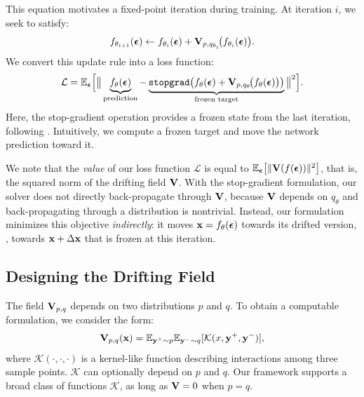 This equation motivates a fixed-point iteration during training. At iteration $i$, we seek to satisfy:
\begin{equation}
f_{\theta_{i+1}}({\boldsymbol{\epsilon}})
\leftarrow
f_{\theta_{i}}({\boldsymbol{\epsilon}})
+
\mathbf{V}_{p,q_{\theta_{i}}}\!\big(f_{\theta_{i}}({\boldsymbol{\epsilon}})\big).
\end{equation}
We convert this update rule into a loss function:
\begin{equation}
\label{eq:train_loss}
\mathcal{L}
=
\mathbb{E}_{{\boldsymbol{\epsilon}}}
\Big[
\big\|
\underbrace{f_{\theta}({\boldsymbol{\epsilon}})}_{\text{prediction}}
-
\underbrace{
\text{\texttt{stopgrad}}\big(
f_{\theta}({\boldsymbol{\epsilon}})
+
\mathbf{V}_{p,q_{\theta}}\!\big(f_{\theta}({\boldsymbol{\epsilon}})\big)
\big)
}_{\text{frozen target}}
\big\|^2
\Big].
\end{equation}
Here, the stop-gradient operation provides a frozen state from the last iteration, following \cite{chen2021exploring,song2023improved}.
Intuitively, we compute a frozen target and move the network prediction toward it.

We note that the \textit{value} of our loss function $\mathcal{L}$ is equal to $\mathbb{E}_{{\boldsymbol{\epsilon}}}
\big[\|\mathbf{V}(f({\boldsymbol{\epsilon}}))\|^2 \big]$, that is, the squared norm of the drifting field $\mathbf{V}$. 
With the stop-gradient formulation, our solver does not directly back-propagate through $\mathbf{V}$, because $\mathbf{V}$ depends on $q_\theta$ and back-propagating through a distribution is nontrivial.
Instead, our formulation minimizes this objective \textit{indirectly}: it moves $\mathbf{x}=f_{\theta}({\boldsymbol{\epsilon}})$ towards its drifted version, \ie, towards $\mathbf{x}+\Delta\mathbf{x}$ that is frozen at this iteration.

\subsection{Designing the Drifting Field}
\label{subsec:instantiation_field}

The field $\mathbf{V}_{p,q}$ depends on two distributions $p$ and $q$. To obtain a computable formulation, we consider the form:
\begin{equation}
\label{eq:kernel_K}
\mathbf{V}_{p,q}(\mathbf{x})=\mathbb E_{\mathbf{y}^{+} \sim p}\mathbb E_{\mathbf{y}^{-} \sim q} [\mathcal{K}(x,\mathbf{y}^{+},\mathbf{y}^{-})],
\end{equation}
where $\mathcal{K}(\cdot,\cdot,\cdot)$ is a kernel-like function describing interactions among three sample points. $\mathcal{K}$ can optionally depend on $p$ and $q$.
Our framework supports a broad class of functions $\mathcal{K}$, as long as $\mathbf{V}=\text{0}$ when $p=q$. 

